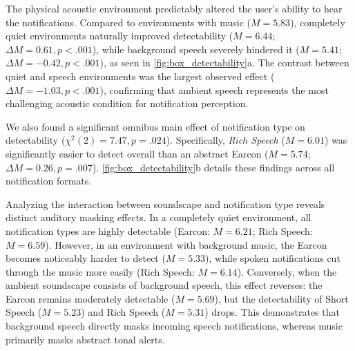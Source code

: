 The physical acoustic environment predictably altered the user's ability to hear the notifications. Compared to environments with music ($M = 5.83$), completely quiet environments naturally improved detectability ($M = 6.44$; $\Delta M = 0.61, p < .001$), while background speech severely hindered it ($M = 5.41$; $\Delta M = -0.42, p < .001$), as seen in \autoref{fig:box_detectability}a. The contrast between quiet and speech environments was the largest observed effect ($\Delta M = -1.03, p < .001$), confirming that ambient speech represents the most challenging acoustic condition for notification perception.

We also found a significant omnibus main effect of notification type on detectability ($\chi^2(2) = 7.47, p = .024$). Specifically, \textit{Rich Speech} ($M = 6.01$) was significantly easier to detect overall than an abstract Earcon ($M = 5.74$; $\Delta M = 0.26, p = .007$). \autoref{fig:box_detectability}b details these findings across all notification formats.

Analyzing the interaction between soundscape and notification type reveals distinct auditory masking effects. In a completely quiet environment, all notification types are highly detectable (Earcon: $M = 6.21$; Rich Speech: $M = 6.59$). However, in an environment with background music, the Earcon becomes noticeably harder to detect ($M = 5.33$), while spoken notifications cut through the music more easily (Rich Speech: $M = 6.14$). Conversely, when the ambient soundscape consists of background speech, this effect reverses: the Earcon remains moderately detectable ($M = 5.69$), but the detectability of Short Speech ($M = 5.23$) and Rich Speech ($M = 5.31$) drops. This demonstrates that background speech directly masks incoming speech notifications, whereas music primarily masks abstract tonal alerts.

